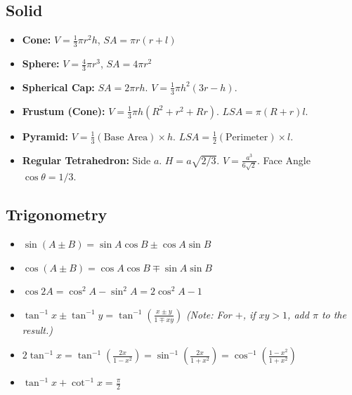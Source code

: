\subsection{Solid}
\begin{itemize}[leftmargin=*]
    \item \textbf{Cone:} $V=\frac{1}{3}\pi r^2 h$, $SA = \pi r(r+l)$
    \item \textbf{Sphere:} $V=\frac{4}{3}\pi r^3$, $SA = 4\pi r^2$
    \item \textbf{Spherical Cap:} $SA = 2\pi r h$. $V = \frac{1}{3}\pi h^2(3r-h)$.
    \item \textbf{Frustum (Cone):} $V = \frac{1}{3}\pi h (R^2 + r^2 + Rr)$. $LSA = \pi(R+r)l$.
    \item \textbf{Pyramid:} $V = \frac{1}{3} (\text{Base Area}) \times h$. $LSA = \frac{1}{2} (\text{Perimeter}) \times l$.
    \item \textbf{Regular Tetrahedron:} Side $a$. $H = a\sqrt{2/3}$. $V = \frac{a^3}{6\sqrt{2}}$. Face Angle $\cos\theta = 1/3$.
\end{itemize}
\subsection{Trigonometry}
\begin{itemize}[leftmargin=*]
    \item $\sin(A\pm B) = \sin A\cos B \pm \cos A\sin B$
    \item $\cos(A\pm B) = \cos A\cos B \mp \sin A\sin B$
    \item $\cos 2A = \cos^2 A - \sin^2 A = 2\cos^2 A - 1$
    \item $\tan^{-1}x \pm \tan^{-1}y = \tan^{-1}\left( \frac{x \pm y}{1 \mp xy} \right)$
          \textit{(Note: For $+$, if $xy > 1$, add $\pi$ to the result.)}
    \item $2\tan^{-1}x = \tan^{-1}\left(\frac{2x}{1-x^2}\right) = \sin^{-1}\left(\frac{2x}{1+x^2}\right) = \cos^{-1}\left(\frac{1-x^2}{1+x^2}\right)$
    \item $\tan^{-1}x + \cot^{-1}x = \frac{\pi}{2}$
\end{itemize}

